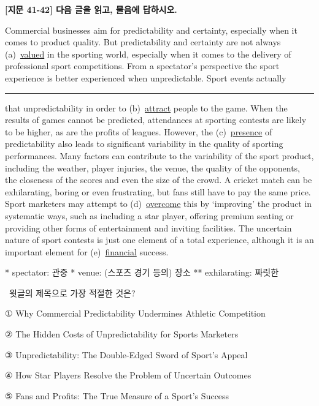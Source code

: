 \documentclass[11pt,a4paper]{article}
\newcommand{\qno}[1]{\par\vspace{8pt}\noindent{\sffamily\bfseries #1.}\ }
\newcommand{\instr}[1]{{\sffamily #1}\par\vspace{3pt}}
\begin{document}
\begin{center}
{\fontsize{15}{17}\selectfont\sffamily\bfseries [지문 41-42] 다음 글을 읽고, 물음에 답하시오.}
\end{center}
\vspace{4pt}

\begin{pbox}
\hspace{1em}Commercial businesses aim for predictability and certainty, especially when it comes to product quality. But predictability and certainty are not always (a)~\underline{valued} in the sporting world, especially when it comes to the delivery of professional sport competitions. From a spectator's perspective the sport experience is better experienced when unpredictable. Sport events actually \rule{3cm}{0.4pt} that unpredictability in order to (b)~\underline{attract} people to the game. When the results of games cannot be predicted, attendances at sporting contests are likely to be higher, as are the profits of leagues. However, the (c)~\underline{presence} of predictability also leads to significant variability in the quality of sporting performances. Many factors can contribute to the variability of the sport product, including the weather, player injuries, the venue, the quality of the opponents, the closeness of the scores and even the size of the crowd. A cricket match can be exhilarating, boring or even frustrating, but fans still have to pay the same price. Sport marketers may attempt to (d)~\underline{overcome} this by `improving' the product in systematic ways, such as including a star player, offering premium seating or providing other forms of entertainment and inviting facilities. The uncertain nature of sport contests is just one element of a total experience, although it is an important element for (e)~\underline{financial} success.
\par\vspace{4pt}\footnotesize\noindent
* spectator: 관중 \quad ** venue: (스포츠 경기 등의) 장소 \quad *** exhilarating: 짜릿한
\end{pbox}

\qno{1}\instr{윗글의 제목으로 가장 적절한 것은?}
\begin{choices}
\item ① Why Commercial Predictability Undermines Athletic Competition
\item ② The Hidden Costs of Unpredictability for Sports Marketers
\item ③ Unpredictability: The Double-Edged Sword of Sport's Appeal
\item ④ How Star Players Resolve the Problem of Uncertain Outcomes
\item ⑤ Fans and Profits: The True Measure of a Sport's Success
\end{choices}
\end{document}

